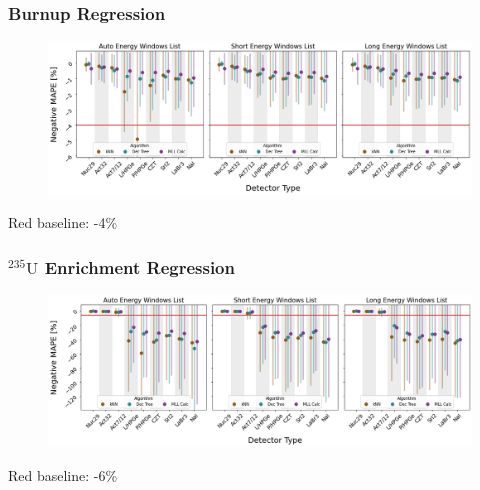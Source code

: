 \begin{frame}
  \frametitle{Burnup Regression}
  \begin{adjustwidth}{-15pt}{-10pt}
  \begin{figure}
    \centering
    \includegraphics[width=1.1\textwidth]{./figures/detector_preds_wrt_enlist_MAPE_burn.png}
  \end{figure}
  \vspace{12pt} \centering Red baseline: -4\% %
  \end{adjustwidth}
\end{frame}

\begin{frame}
  \frametitle{${}^{235}\text{U}$ Enrichment Regression}
  \begin{adjustwidth}{-15pt}{-10pt}
  \begin{figure}
    \centering
    \includegraphics[width=1.1\textwidth]{./figures/detector_preds_wrt_enlist_MAPE_enri.png}
  \end{figure}
  \vspace{12pt} \centering Red baseline: -6\% 
  \end{adjustwidth}
\end{frame}

